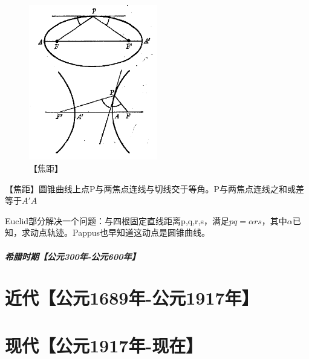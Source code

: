 \documentclass[UTF8]{../09-Mathematics}
\begin{document}
\begin{figure}[h]
    \centering
    \includegraphics[width=0.5\textwidth]{./resources/古今数学思想-图4_29.png}
    \caption{【焦距】}\label{fig:7}
\end{figure}
【焦距】圆锥曲线上点P与两焦点连线与切线交于等角。P与两焦点连线之和或差等于$A'A$

Euclid部分解决一个问题：与四根固定直线距离p,q,r,s，满足$pq = \alpha rs$，其中$\alpha$已知，求动点轨迹。Pappus也早知道这动点是圆锥曲线。

\paragraph{希腊时期【公元300年-公元600年】}



\chapter{近代【公元1689年-公元1917年】}


\chapter{现代【公元1917年-现在】}
\end{document}

